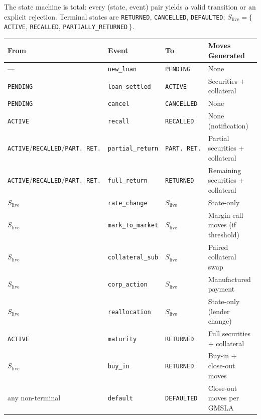 The state machine is total: every (state, event) pair yields a valid transition or an explicit rejection. Terminal states are \texttt{RETURNED}, \texttt{CANCELLED}, \texttt{DEFAULTED}; $S_{\mathrm{live}} = \{\,$\texttt{ACTIVE}, \texttt{RECALLED}, \texttt{PARTIALLY\_RETURNED}$\,\}$.

\begin{center}
\small
\begin{tabular}{l l l l}
\toprule
\textbf{From} & \textbf{Event} & \textbf{To} & \textbf{Moves Generated} \\
\midrule
--- & \texttt{new\_loan} & \texttt{PENDING} & None \\
\texttt{PENDING} & \texttt{loan\_settled} & \texttt{ACTIVE} & Securities + collateral \\
\texttt{PENDING} & \texttt{cancel} & \texttt{CANCELLED} & None \\
\texttt{ACTIVE} & \texttt{recall} & \texttt{RECALLED} & None (notification) \\
\texttt{ACTIVE}/\texttt{RECALLED}/\texttt{PART.\ RET.} & \texttt{partial\_return} & \texttt{PART.\ RET.} & Partial securities + collateral \\
\texttt{ACTIVE}/\texttt{RECALLED}/\texttt{PART.\ RET.} & \texttt{full\_return} & \texttt{RETURNED} & Remaining securities + collateral \\
$S_{\mathrm{live}}$ & \texttt{rate\_change} & $S_{\mathrm{live}}$ & State-only \\
$S_{\mathrm{live}}$ & \texttt{mark\_to\_market} & $S_{\mathrm{live}}$ & Margin call moves (if threshold) \\
$S_{\mathrm{live}}$ & \texttt{collateral\_sub} & $S_{\mathrm{live}}$ & Paired collateral swap \\
$S_{\mathrm{live}}$ & \texttt{corp\_action} & $S_{\mathrm{live}}$ & Manufactured payment \\
$S_{\mathrm{live}}$ & \texttt{reallocation} & $S_{\mathrm{live}}$ & State-only (lender change) \\
\texttt{ACTIVE} & \texttt{maturity} & \texttt{RETURNED} & Full securities + collateral \\
$S_{\mathrm{live}}$ & \texttt{buy\_in} & \texttt{RETURNED} & Buy-in + close-out moves \\
any non-terminal & \texttt{default} & \texttt{DEFAULTED} & Close-out moves per GMSLA \\
\bottomrule
\end{tabular}
\end{center}

